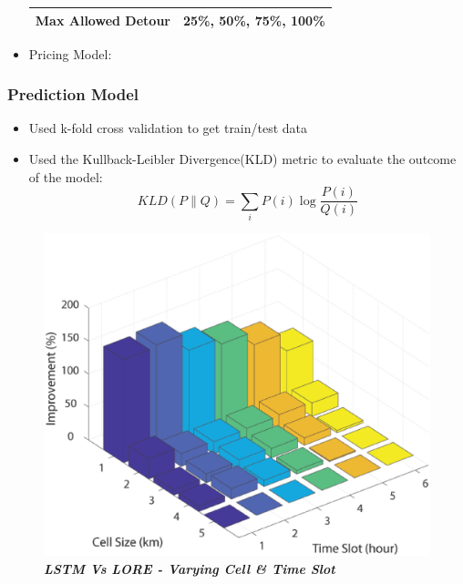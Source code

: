 \documentclass[t]{beamer}
\begin{document}
\begin{frame}
\begin{itemize}
{\begin{table}[!ht]
\begin{center}
\begin{tabular}{|c|c|}
			\hline
			Max Allowed Detour & 25\%, \textbf{50\%}, 75\%, 100\%\\
			\hline
		\end{tabular}
	\end{center}
\end{table}
}
\item<4-> Pricing Model:
\end{itemize}
\end{frame}

\begin{frame}\frametitle{Prediction Model}
\begin{itemize}
\item Used k-fold cross validation to get train/test data
\item Used the Kullback-Leibler Divergence(KLD) metric to evaluate the outcome of the model:
\small{
\begin{equation*}
KLD\left(P \middle\| Q\right)=\sum_i P(i) \log \frac{P(i)}{Q(i)}
\end{equation*}
}
\end{itemize}
\vspace{-0.25in}
\begin{figure}
	\centering
    \includegraphics[width = 0.45\columnwidth]{klddiff}\\
    \tiny{\textbf{\textit{LSTM Vs LORE - Varying Cell \& Time Slot}}}
\end{figure}
\end{frame}
\end{document}
